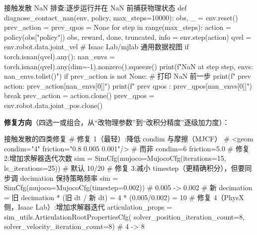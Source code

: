 \begin{codebox}[Python]{接触发散 NaN 排查:逐步运行并在 NaN 前捕获物理状态}
def diagnose_contact_nan(env, policy, max_steps=10000):
    obs, _ = env.reset()
    prev_action = prev_qpos = None
    for step in range(max_steps):
        action = policy(obs["policy"])
        obs, reward, done, truncated, info = env.step(action)
        qvel = env.robot.data.joint_vel                 # Isaac Lab/mjlab 通用数据视图
        if torch.isnan(qvel).any():
            nan_envs = torch.isnan(qvel).any(dim=-1).nonzero().squeeze()
            print(f"NaN at step {step}, envs: {nan_envs.tolist()}")
            if prev_action is not None:                 # 打印 NaN 前一步
                print(f"  prev action: {prev_action[nan_envs[0]]}")
                print(f"  prev qpos  : {prev_qpos[nan_envs[0]]}")
            break
        prev_action = action.clone()
        prev_qpos   = env.robot.data.joint_pos.clone()
\end{codebox}


\textbf{修复方向}（四选一或组合，从“改物理参数”到“改积分精度”逐级加力度）：

\begin{codebox}[Python]{接触发散的四类修复}
# 修复 1（最轻）:降低 condim 与摩擦（MJCF）
#   <geom condim="4" friction="0.8 0.005 0.001"/>   # 而非 condim=6 friction=5.0
# 修复 2:增加求解器迭代次数
sim = SimCfg(mujoco=MujocoCfg(iterations=15, ls_iterations=25))   # 默认 10/20
# 修复 3:减小 timestep（更精确积分），但要同步调 decimation 保持策略频率
sim = SimCfg(mujoco=MujocoCfg(timestep=0.002))                    # 0.005 -> 0.002
#   新 decimation = 旧 decimation * (旧 dt / 新 dt) = 4 * (0.005/0.002) = 10
# 修复 4（PhysX 侧，Isaac Lab）:增加求解器迭代
articulation_props = sim_utils.ArticulationRootPropertiesCfg(
    solver_position_iteration_count=8, solver_velocity_iteration_count=8)  # 4 -> 8
\end{codebox}


